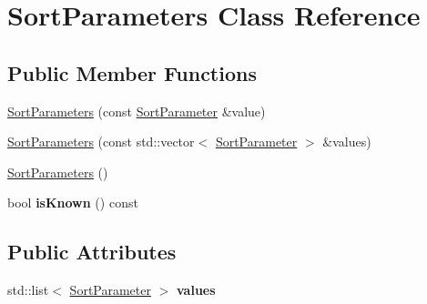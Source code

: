 \hypertarget{class_sort_parameters}{\section{Sort\+Parameters Class Reference}
\label{class_sort_parameters}
}
\subsection*{Public Member Functions}
\begin{DoxyCompactItemize}
\item 
\hyperlink{class_sort_parameters_a3e09d106c13d4436e73109c8b0cfa60d}{Sort\+Parameters} (const \hyperlink{class_sort_parameter}{Sort\+Parameter} \&value)
\item 
\hyperlink{class_sort_parameters_aa126d980ea7fd9ec7c088f3c642d788c}{Sort\+Parameters} (const std\+::vector$<$ \hyperlink{class_sort_parameter}{Sort\+Parameter} $>$ \&values)
\item 
\hyperlink{class_sort_parameters_ab5776bf717741ef321cf59bc712f55eb}{Sort\+Parameters} ()
\item 
\hypertarget{class_sort_parameters_aa29d3a50f026c0d840c16af26f8d7b07}{bool {\bfseries is\+Known} () const }\label{class_sort_parameters_aa29d3a50f026c0d840c16af26f8d7b07}

\end{DoxyCompactItemize}
\subsection*{Public Attributes}
\begin{DoxyCompactItemize}
\item 
\hypertarget{class_sort_parameters_ad40f9ae2cd97faa92c29f2fc1c3941d0}{std\+::list$<$ \hyperlink{class_sort_parameter}{Sort\+Parameter} $>$ {\bfseries values}}\label{class_sort_parameters_ad40f9ae2cd97faa92c29f2fc1c3941d0}

\end{DoxyCompactItemize}


